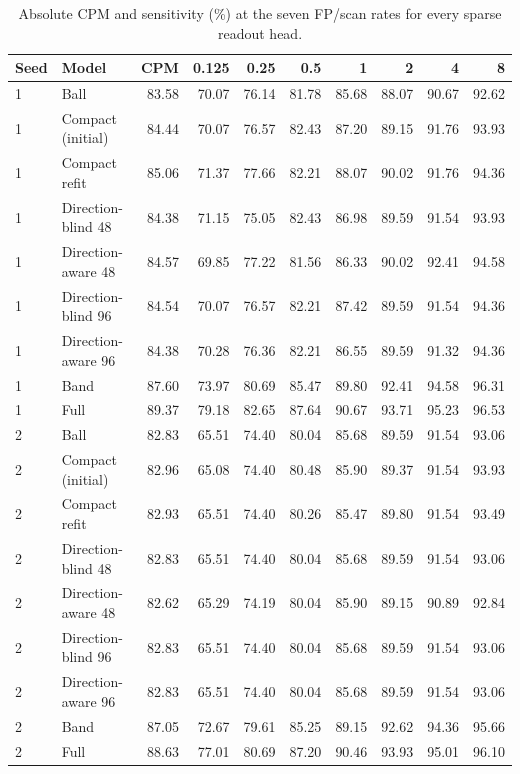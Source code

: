 \begin{table}[!t]
\centering
\footnotesize\setlength{\tabcolsep}{4pt}
\caption{Absolute CPM and sensitivity (\%) at the seven FP/scan rates for every sparse readout head.}
\label{tab:attention_absolute}
\begin{tabular}{@{}llrrrrrrrr@{}}
\toprule
Seed & Model & CPM & 0.125 & 0.25 & 0.5 & 1 & 2 & 4 & 8 \\
\midrule
1 & Ball & 83.58 & 70.07 & 76.14 & 81.78 & 85.68 & 88.07 & 90.67 & 92.62 \\
1 & Compact (initial) & 84.44 & 70.07 & 76.57 & 82.43 & 87.20 & 89.15 & 91.76 & 93.93 \\
1 & Compact refit & 85.06 & 71.37 & 77.66 & 82.21 & 88.07 & 90.02 & 91.76 & 94.36 \\
1 & Direction-blind 48 & 84.38 & 71.15 & 75.05 & 82.43 & 86.98 & 89.59 & 91.54 & 93.93 \\
1 & Direction-aware 48 & 84.57 & 69.85 & 77.22 & 81.56 & 86.33 & 90.02 & 92.41 & 94.58 \\
1 & Direction-blind 96 & 84.54 & 70.07 & 76.57 & 82.21 & 87.42 & 89.59 & 91.54 & 94.36 \\
1 & Direction-aware 96 & 84.38 & 70.28 & 76.36 & 82.21 & 86.55 & 89.59 & 91.32 & 94.36 \\
1 & Band & 87.60 & 73.97 & 80.69 & 85.47 & 89.80 & 92.41 & 94.58 & 96.31 \\
1 & Full & 89.37 & 79.18 & 82.65 & 87.64 & 90.67 & 93.71 & 95.23 & 96.53 \\
\midrule
2 & Ball & 82.83 & 65.51 & 74.40 & 80.04 & 85.68 & 89.59 & 91.54 & 93.06 \\
2 & Compact (initial) & 82.96 & 65.08 & 74.40 & 80.48 & 85.90 & 89.37 & 91.54 & 93.93 \\
2 & Compact refit & 82.93 & 65.51 & 74.40 & 80.26 & 85.47 & 89.80 & 91.54 & 93.49 \\
2 & Direction-blind 48 & 82.83 & 65.51 & 74.40 & 80.04 & 85.68 & 89.59 & 91.54 & 93.06 \\
2 & Direction-aware 48 & 82.62 & 65.29 & 74.19 & 80.04 & 85.90 & 89.15 & 90.89 & 92.84 \\
2 & Direction-blind 96 & 82.83 & 65.51 & 74.40 & 80.04 & 85.68 & 89.59 & 91.54 & 93.06 \\
2 & Direction-aware 96 & 82.83 & 65.51 & 74.40 & 80.04 & 85.68 & 89.59 & 91.54 & 93.06 \\
2 & Band & 87.05 & 72.67 & 79.61 & 85.25 & 89.15 & 92.62 & 94.36 & 95.66 \\
2 & Full & 88.63 & 77.01 & 80.69 & 87.20 & 90.46 & 93.93 & 95.01 & 96.10 \\
\bottomrule
\end{tabular}
\end{table}
